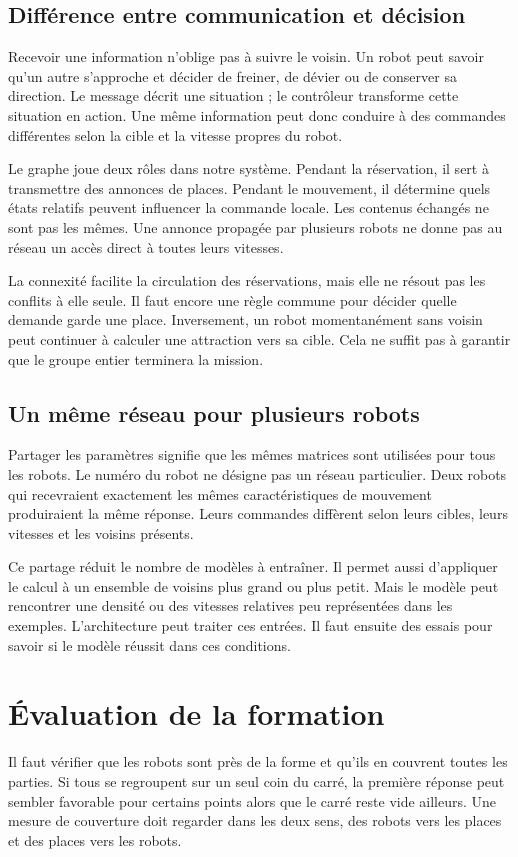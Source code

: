 \subsection{Différence entre communication et décision}
Recevoir une information n'oblige pas à suivre le voisin. Un robot peut savoir qu'un autre s'approche et décider de freiner, de dévier ou de conserver sa direction. Le message décrit une situation ; le contrôleur transforme cette situation en action. Une même information peut donc conduire à des commandes différentes selon la cible et la vitesse propres du robot.

Le graphe joue deux rôles dans notre système. Pendant la réservation, il sert à transmettre des annonces de places. Pendant le mouvement, il détermine quels états relatifs peuvent influencer la commande locale. Les contenus échangés ne sont pas les mêmes. Une annonce propagée par plusieurs robots ne donne pas au réseau un accès direct à toutes leurs vitesses.

La connexité facilite la circulation des réservations, mais elle ne résout pas les conflits à elle seule. Il faut encore une règle commune pour décider quelle demande garde une place. Inversement, un robot momentanément sans voisin peut continuer à calculer une attraction vers sa cible. Cela ne suffit pas à garantir que le groupe entier terminera la mission.

\subsection{Un même réseau pour plusieurs robots}
Partager les paramètres signifie que les mêmes matrices sont utilisées pour tous les robots. Le numéro du robot ne désigne pas un réseau particulier. Deux robots qui recevraient exactement les mêmes caractéristiques de mouvement produiraient la même réponse. Leurs commandes diffèrent selon leurs cibles, leurs vitesses et les voisins présents.

Ce partage réduit le nombre de modèles à entraîner. Il permet aussi d'appliquer le calcul à un ensemble de voisins plus grand ou plus petit. Mais le modèle peut rencontrer une densité ou des vitesses relatives peu représentées dans les exemples. L'architecture peut traiter ces entrées. Il faut ensuite des essais pour savoir si le modèle réussit dans ces conditions.

\section{Évaluation de la formation}
Il faut vérifier que les robots sont près de la forme et qu'ils en couvrent toutes les parties. Si tous se regroupent sur un seul coin du carré, la première réponse peut sembler favorable pour certains points alors que le carré reste vide ailleurs. Une mesure de couverture doit regarder dans les deux sens, des robots vers les places et des places vers les robots.

